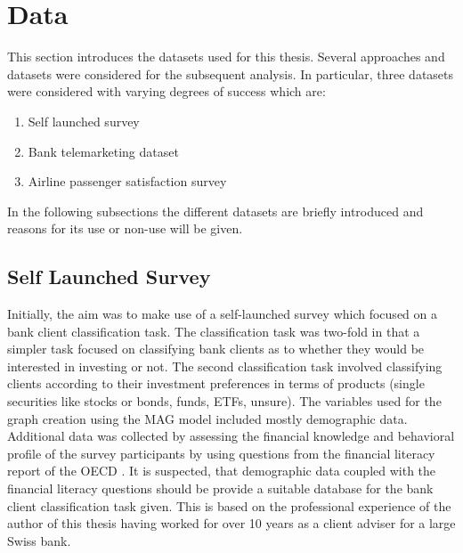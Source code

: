 
  \section{Data}
  
  This section introduces the datasets used for this thesis. Several approaches
  and datasets were considered for the subsequent analysis. In particular, three
  datasets were considered with varying degrees of success which are:

  \begin{enumerate}
    \item Self launched survey
    \item Bank telemarketing dataset
    \item Airline passenger satisfaction survey
  \end{enumerate}

  \noindent In the following subsections the different datasets are briefly 
  introduced and reasons for its use or non-use will be given. 

  \subsection{Self Launched Survey}
  \label{section:self_survey}

  Initially, the aim was to make use of a self-launched survey which focused on
  a bank client classification task. The classification task was two-fold in 
  that a simpler task focused on classifying bank clients as to whether they 
  would be interested in investing or not. The second classification task
  involved classifying clients according to their investment preferences in
  terms of products (single securities like stocks or bonds, funds, ETFs,
  unsure). The variables used for the graph creation using the MAG model
  included mostly demographic data. Additional data was collected by assessing
  the financial knowledge and behavioral profile of the survey participants by 
  using questions from the financial literacy report of the OECD \citep{OECD2017}.
  It is suspected, that demographic data coupled with the financial literacy
  questions should be provide a suitable database for the bank client
  classification task given. This is based on the professional experience of
  the author of this thesis having worked for over 10 years as a client adviser
  for a large Swiss bank. \\

